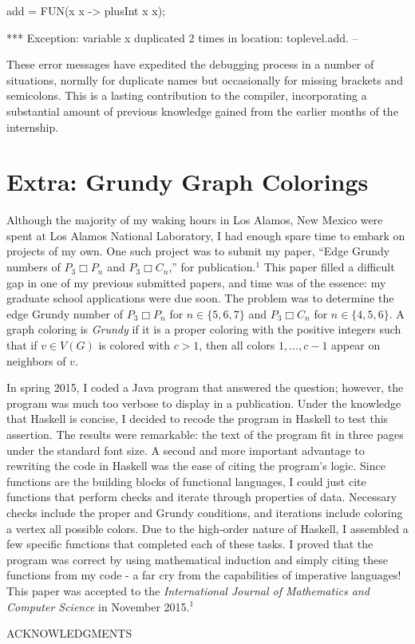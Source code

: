 \documentclass[11pt]{article}
\begin{document}
\hspace{1cm}\begin{verbbox}
add = FUN(x x -> plusInt x x);

*** Exception:  variable x duplicated 2 times in location: toplevel.add. -- 
\end{verbbox}
\theverbbox

These error messages have expedited the debugging process in a number
of situations, normlly for duplicate names but occasionally for missing
brackets and semicolons. This is a lasting contribution to the compiler,
incorporating a substantial amount of previous knowledge gained from the
earlier months of the internship.

\section{Extra: Grundy Graph Colorings}

Although the majority of my waking hours in Los Alamos, New Mexico were spent
at Los Alamos National Laboratory, I had enough spare time to embark on
projects of my own. One such project was to submit my paper, ``Edge Grundy numbers of $P_3 \Box P_n$ and $P_3 \Box C_n$,'' for
publication.$^1$ This paper filled a difficult gap in one of my previous submitted papers,
and time was of the essence: my graduate school applications were due
soon. The problem was to determine the edge Grundy number of $P_3 \Box P_n$ for $n \in \{5,6,7\}$ and $P_3 \Box C_n$ for $n \in \{4,5,6\}$. A graph coloring is \emph{Grundy} if it is a proper coloring with the positive integers such that if $v \in V(G)$ is colored with $c>1$, then all colors $1, \ldots, c-1$ appear on neighbors of $v$.

In spring 2015, I coded a Java program that answered the question; however, the program was much too verbose to display in a
publication. Under the knowledge that Haskell is concise, I decided to recode
the program in Haskell to test this assertion. The results were remarkable: the
text of the program fit in three pages under the standard font size. A second and
more important advantage to rewriting the code in Haskell was the ease of
citing the program's logic. Since functions are the building blocks of
functional languages, I could just cite functions that perform checks and
iterate through properties of data. Necessary checks include the proper and
Grundy conditions, and iterations include coloring a vertex all possible
colors. Due to the high-order nature of Haskell, I assembled a few specific
functions that completed each of these tasks. I proved that the program was correct by using mathematical induction and simply citing these
functions from my code - a far cry from the capabilities of imperative
languages! This paper was accepted to the \emph{International Journal of Mathematics and Computer Science} in November 2015.$^1$
\begin{center}
ACKNOWLEDGMENTS
\end{center}
\end{document}
